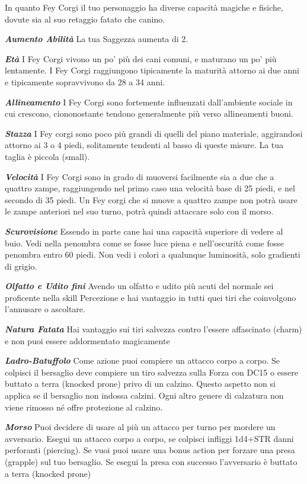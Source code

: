 In quanto Fey Corgi il tuo personaggio ha diverse capacità magiche e fisiche, dovute sia al suo retaggio fatato che canino.

\textit{\textbf{Aumento Abilità}} La tua Saggezza aumenta di 2.

\textit{\textbf{Età}} I Fey Corgi vivono un po' più dei cani comuni, e maturano un po' più lentamente. I Fey Corgi raggiungono tipicamente la maturità attorno ai due anni e tipicamente sopravvivono da 28 a 34 anni.

\textit{\textbf{Allineamento}} I Fey Corgi sono fortemente influenzati dall'ambiente sociale in cui crescono, ciononostante tendono generalmente più verso allineamenti buoni.

\textit{\textbf{Stazza}} I Fey corgi sono poco più grandi di quelli del piano materiale, aggirandosi attorno ai 3 o 4 piedi, solitamente tendenti al basso di queste misure. La tua taglia è piccola (small).

\textit{\textbf{Velocità}} I Fey Corgi sono in grado di muoversi facilmente sia a due che a quattro zampe, raggiungendo nel primo caso una velocità base di 25 piedi, e nel secondo di 35 piedi. Un Fey corgi che si muove a quattro zampe non potrà usare le zampe anteriori nel suo turno, potrà quindi attaccare solo con il morso.

\textit{\textbf{Scurovisione}} Essendo in parte cane hai una capacità superiore di vedere al buio. Vedi nella penombra come se fosse luce piena e nell'oscurità come fosse penombra entro 60 piedi. Non vedi i colori a qualunque luminosità, solo gradienti di grigio.

\textit{\textbf{Olfatto e Udito fini}} Avendo un olfatto e udito più acuti del normale sei proficente nella skill Percezione e hai vantaggio in tutti quei tiri che coinvolgono l'annusare o ascoltare.

\textit{\textbf{Natura Fatata}} Hai vantaggio sui tiri salvezza contro l'essere affascinato (charm) e non puoi essere addormentato magicamente

\textit{\textbf{Ladro-Batuffolo}} Come azione puoi compiere un attacco corpo a corpo. Se colpisci il bersaglio deve compiere un tiro salvezza sulla Forza con DC15 o essere buttato a terra (knocked prone) privo di un calzino. Questo aspetto non si applica se il bersaglio non indossa calzini. Ogni altro genere di calzatura non viene rimosso né offre protezione al calzino.

\textit{\textbf{Morso}} Puoi decidere di usare al più un attacco per turno per mordere un avversario. Esegui un attacco corpo a corpo, se colpisci infliggi 1d4+STR danni perforanti (piercing). Se vuoi puoi usare una bonus action per forzare una presa (grapple) sul tuo bersaglio. Se esegui la presa con successo l'avversario è buttato a terra (knocked prone)

